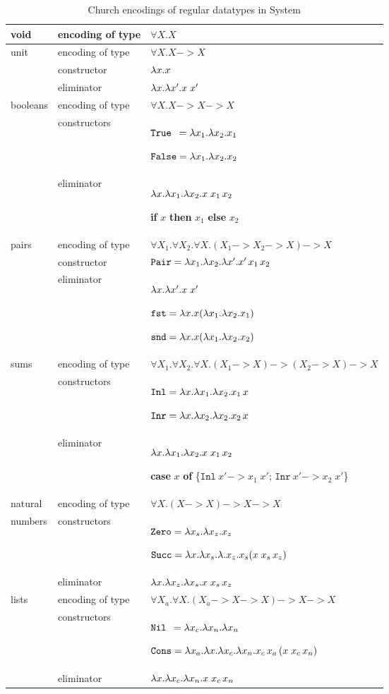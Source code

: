\begin{table}
\begin{tabular}{p{17mm}|l p{80mm}}
	\hline
void
& encoding of type	& $\forall X.X$
	\\\hline
unit
& encoding of type	& $\forall X.X -> X$	\\
& constructor		& $\lambda x.x$ \\
& eliminator		& $\lambda x.\lambda x'.x\;x'$
	\\\hline
booleans
& encoding of type	& $\forall X.X -> X -> X$ \\
& constructors		& $\mathtt{True}\,\,\, = \lambda x_1.\lambda x_2. x_1$ \par
			$\mathtt{False} = \lambda x_1.\lambda x_2. x_2$ \\
& eliminator		& $\lambda x.\lambda x_1. \lambda x_2. x\;x_1\,x_2$ \par
			\textbf{if} $x$ \textbf{then} $x_1$ \textbf{else} $x_2$
	\\\hline
pairs
& encoding of type	& $\forall X_1.\forall X_2.\forall X. (X_1 -> X_2 -> X) -> X$ \\
& constructor		& $\mathtt{Pair} = \lambda x_1.\lambda x_2.\lambda x'.x'\,x_1\,x_2$ \\
& eliminator		& $\lambda x.\lambda x'.x\;x'$ \par
			$\mathtt{fst} = \lambda x.x(\lambda x_1.\lambda x_2.x_1)$ \par
			$\mathtt{snd} = \lambda x.x(\lambda x_1.\lambda x_2.x_2)$
	\\\hline
sums
& encoding of type	& $\forall X_1.\forall X_2.\forall X. (X_1 -> X) -> (X_2 -> X) -> X$\\
& constructors		& $\mathtt{Inl} = \lambda x. \lambda x_1. \lambda x_2 . x_1\,x$ \par
			$\mathtt{Inr} = \lambda x. \lambda x_2. \lambda x_2 . x_2\,x$ \\
& eliminator		& $\lambda x.\lambda x_1. \lambda x_2. x\;x_1\,x_2$ \par
			\textbf{case} $x$ \textbf{of}
				\{$\mathtt{Inl}~x' -> x_1\;x'$;
				  $\mathtt{Inr}~x' -> x_2\;x'$\}
	\\\hline
natural
& encoding of type	& $\forall X. (X -> X) -> X -> X$ \\
numbers
& constructors		& $\mathtt{Zero} = \lambda x_s. \lambda x_z. x_z$ \par
			$\mathtt{Succ} = \lambda x. \lambda x_s. \lambda. x_z. x_s (x\;x_s\,x_z)$ \\
& eliminator		& $\lambda x.\lambda x_z. \lambda x_s.x\;x_s\,x_z$
	\\\hline
lists
& encoding of type	& $\forall X_a.\forall X. (X_a -> X -> X) -> X -> X$ \\
& constructors		& $\mathtt{Nil}\;\, = \lambda x_c.\lambda x_n.\lambda x_n$ \par
			$\mathtt{Cons} = \lambda x_a.\lambda x.\lambda x_c.\lambda x_n. x_c\,x_a\,(x\;x_c\,x_n)$ \\
& eliminator		& $\lambda x.\lambda x_c. \lambda x_n.x\;x_c\,x_n$
	\\\hline
\end{tabular}
\caption{Church encodings of regular datatypes in System \F}
\label{tbl:dataF}
\end{table}

